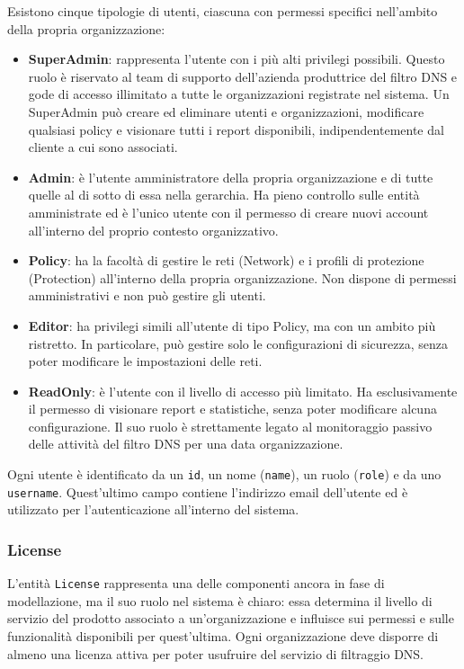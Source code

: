 Esistono cinque tipologie di utenti, ciascuna con permessi specifici nell'ambito della propria organizzazione:
\begin{itemize}
  \item \textbf{SuperAdmin}: rappresenta l'utente con i più alti privilegi possibili. Questo ruolo è riservato al team di supporto dell'azienda produttrice del filtro DNS e gode di accesso illimitato a tutte le organizzazioni registrate nel sistema. Un SuperAdmin può creare ed eliminare utenti e organizzazioni, modificare qualsiasi policy e visionare tutti i report disponibili, indipendentemente dal cliente a cui sono associati.
  \item \textbf{Admin}: è l'utente amministratore della propria organizzazione e di tutte quelle al di sotto di essa nella gerarchia. Ha pieno controllo sulle entità amministrate ed è l'unico utente con il permesso di creare nuovi account all'interno del proprio contesto organizzativo.
  \item \textbf{Policy}: ha la facoltà di gestire le reti (Network) e i profili di protezione (Protection) all'interno della propria organizzazione. Non dispone di permessi amministrativi e non può gestire gli utenti.
  \item \textbf{Editor}: ha privilegi simili all'utente di tipo Policy, ma con un ambito più ristretto. In particolare, può gestire solo le configurazioni di sicurezza, senza poter modificare le impostazioni delle reti.
  \item \textbf{ReadOnly}: è l'utente con il livello di accesso più limitato. Ha esclusivamente il permesso di visionare report e statistiche, senza poter modificare alcuna configurazione. Il suo ruolo è strettamente legato al monitoraggio passivo delle attività del filtro DNS per una data organizzazione.
\end{itemize}

Ogni utente è identificato da un \texttt{id}, un nome (\texttt{name}), un ruolo (\texttt{role}) e da uno \texttt{username}. Quest'ultimo campo contiene l'indirizzo email dell'utente ed è utilizzato per l'autenticazione all'interno del sistema.

\subsubsection{License}
L'entità \texttt{License} rappresenta una delle componenti ancora in fase di modellazione, ma il suo ruolo nel sistema è chiaro: essa determina il livello di servizio del prodotto associato a un'organizzazione e influisce sui permessi e sulle funzionalità disponibili per quest’ultima. Ogni organizzazione deve disporre di almeno una licenza attiva per poter usufruire del servizio di filtraggio DNS.

